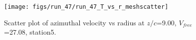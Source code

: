 \begin{figure}[H]
\centering
\texttt{[image: figs/run\_47/run\_47\_T\_vs\_r\_meshscatter]}
\caption{Scatter plot of azimuthal velocity vs radius at $z/c$=9.00, $V_{free}$=27.08, station5.}
\label{fig:run_47_T_vs_r_meshscatter}
\end{figure}


